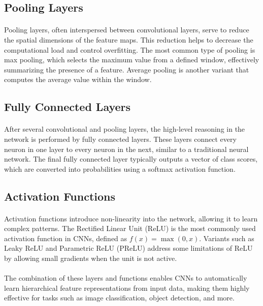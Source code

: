 \subsection{Pooling Layers}
\paragraph{}
Pooling layers, often interspersed between convolutional layers, serve to reduce the spatial dimensions of the feature maps. This reduction helps to decrease the computational load and control overfitting. The most common type of pooling is max pooling, which selects the maximum value from a defined window, effectively summarizing the presence of a feature. Average pooling is another variant that computes the average value within the window.

\subsection{Fully Connected Layers}
\paragraph{}
After several convolutional and pooling layers, the high-level reasoning in the network is performed by fully connected layers. These layers connect every neuron in one layer to every neuron in the next, similar to a traditional neural network. The final fully connected layer typically outputs a vector of class scores, which are converted into probabilities using a softmax activation function.

\subsection{Activation Functions}
\paragraph{}
Activation functions introduce non-linearity into the network, allowing it to learn complex patterns. The Rectified Linear Unit (ReLU) is the most commonly used activation function in CNNs, defined as \(f(x) = \max(0, x)\). Variants such as Leaky ReLU and Parametric ReLU (PReLU) address some limitations of ReLU by allowing small gradients when the unit is not active.

\paragraph{}
The combination of these layers and functions enables CNNs to automatically learn hierarchical feature representations from input data, making them highly effective for tasks such as image classification, object detection, and more.

